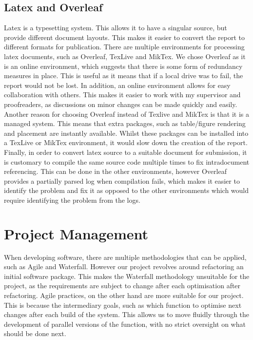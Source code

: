 \subsection{Latex and Overleaf}
Latex is a typesetting system.
This allows it to have a singular source, but provide different document layouts.
This makes it easier to convert the report to different formats for publication.
There are multiple environments for processing latex documents, such as Overleaf, TexLive and MikTex.
We chose Overleaf as it is an online environment, which suggests that there is some form of redundancy measures in place.
This is useful as it means that if a local drive was to fail, the report would not be lost.
In addition, an online environment allows for easy collaboration with others. This makes it easier to work with my supervisor and proofreaders, as discussions on minor changes can be made quickly and easily.
Another reason for choosing Overleaf instead of Texlive and MikTex is that it is a managed system.
This means that extra packages, such as table/figure rendering and placement are instantly available.
Whilst these packages can be installed into a TexLive or MikTex environment, it would slow down the creation of the report.
Finally, in order to convert latex source to a suitable document for submission, it is customary to compile the same source code multiple times to fix intradocument referencing. 
This can be done in the other environments, however Overleaf provides a partially parsed log when compilation fails, which makes it easier to identify the problem and fix it as opposed to the other environments which would require identifying the problem from the logs. %



\section{Project Management}
When developing software, there are multiple methodologies that can be applied, such as Agile and Waterfall.
However our project revolves around refactoring an initial software package.
This makes the Waterfall methodology unsuitable for the project, as the requirements are subject to change after each optimisation after refactoring.
Agile practices, on the other hand are more suitable for our project.
This is because the intermediary goals, such as which function to optimise next changes after each build of the system.
This allows us to move fluidly through the development of parallel versions of the function, with no strict oversight on what should be done next.

